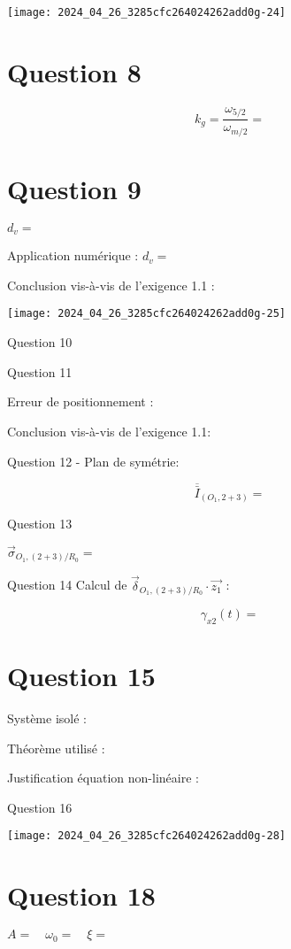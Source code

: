 \begin{center}
\texttt{[image: 2024\_04\_26\_3285cfc264024262add0g-24]}
\end{center}

\section*{Question 8}
$$
k_{g}=\frac{\omega_{5 / 2}}{\omega_{m / 2}}=
$$

\section*{Question 9}
$d_{v}=$

Application numérique : $d_{v}=$

Conclusion vis-à-vis de l'exigence 1.1 :

\begin{center}
\texttt{[image: 2024\_04\_26\_3285cfc264024262add0g-25]}
\end{center}

Question 10

Question 11

Erreur de positionnement :

Conclusion vis-à-vis de l'exigence 1.1:

Question 12 - Plan de symétrie:

$$
\overline{\bar{I}}_{\left(O_{1}, 2+3\right)}=
$$

Question 13

$\vec{\sigma}_{O_{1},(2+3) / R_{0}}=$

Question 14 Calcul de $\vec{\delta}_{O_{1},(2+3) / R_{0}} \cdot \overrightarrow{z_{1}}$ :

$$
\gamma_{x 2}(t)=
$$

\section*{Question 15}
Système isolé :

Théorème utilisé :

Justification équation non-linéaire :

Question 16

\begin{center}
\texttt{[image: 2024\_04\_26\_3285cfc264024262add0g-28]}
\end{center}

\section*{Question 18}
$A=\quad \omega_{0}=\quad \xi=$

